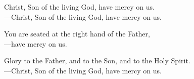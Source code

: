 \responsory

\noindent Christ, Son of the living God, have mercy on us.\\
{\color{red}---\thinspace}Christ, Son of the living God, have mercy on us.

\medskip\noindent You are seated at the right hand of the Father,\\
{\color{red}---\thinspace}have mercy on us.

\medskip\noindent Glory to the Father, and to the Son, and to the Holy Spirit.\\
{\color{red}---\thinspace}Christ, Son of the living God, have mercy on us.